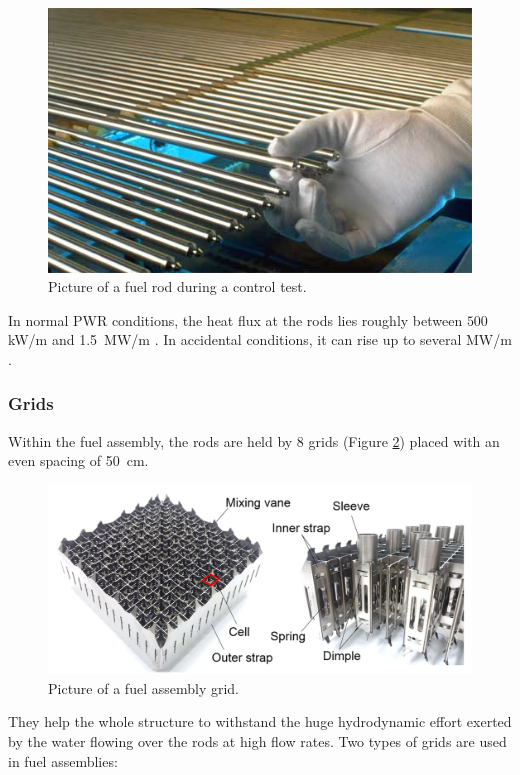 \begin{figure}[!h]
\centering
\includegraphics[width=0.6\linewidth]{img/intro/fuel_rod.jpg}
\caption{Picture of a fuel rod during a control test. \cite{kamin_cycle_2019}}
\label{fig:fuel_rod}
\end{figure}

\npar

\begin{note*}{}
In normal PWR conditions, the heat flux at the rods lies roughly between $500~$kW/m and 1.5~MW/m \cite{pujet_memento_2016}. In accidental conditions, it can rise up to several MW/m \cite{manon_contribution_2000}.
\end{note*}
 
\subsubsection{Grids}

Within the fuel assembly, the rods are held by 8 grids (Figure \ref{fig:fuel_grid}) placed with an even spacing of 50\ cm. 

\begin{figure}[!h]
\centering
\includegraphics[width=0.8\linewidth]{img/intro/pic_grid.png}
\caption{Picture of a fuel assembly grid. \cite{yoo_finite_2019}}
\label{fig:fuel_grid}
\end{figure}

\npar


They help the whole structure to withstand the huge hydrodynamic effort exerted by the water flowing over the rods
at high flow rates. Two types of grids are used in fuel assemblies:

